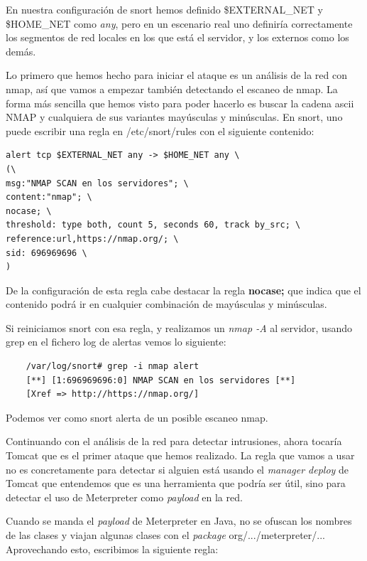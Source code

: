 \documentclass[a4paper,12pt]{scrartcl}
\begin{document}
En nuestra configuración de snort hemos definido \$EXTERNAL\_NET y \$HOME\_NET como \textit{any}, pero en un escenario real uno definiría correctamente los segmentos de red locales en los que está el servidor, y los externos como los demás.

Lo primero que hemos hecho para iniciar el ataque es un análisis de la red con nmap, así que vamos a empezar también detectando el escaneo de nmap. La forma más sencilla que hemos visto para poder hacerlo es buscar la cadena ascii NMAP y cualquiera de sus variantes mayúsculas y minúsculas. En snort, uno puede escribir una regla en /etc/snort/rules con el siguiente contenido:

\begin{verbatim}
alert tcp $EXTERNAL_NET any -> $HOME_NET any \
(\
msg:"NMAP SCAN en los servidores"; \
content:"nmap"; \
nocase; \
threshold: type both, count 5, seconds 60, track by_src; \
reference:url,https://nmap.org/; \
sid: 696969696 \
) 
\end{verbatim}

De la configuración de esta regla cabe destacar la regla \textbf{nocase;} que indica que el contenido podrá ir en cualquier combinación de mayúsculas y minúsculas.

\vspace{10pt}

Si reiniciamos snort con esa regla, y realizamos un \textit{nmap -A} al servidor, usando grep en el fichero log de alertas vemos lo siguiente:

\begin{verbatim}
	/var/log/snort# grep -i nmap alert
	[**] [1:696969696:0] NMAP SCAN en los servidores [**]
	[Xref => http://https://nmap.org/]
\end{verbatim}

\noindent Podemos ver como snort alerta de un posible escaneo nmap.

\vspace{10pt}

Continuando con el análisis de la red para detectar intrusiones, ahora tocaría Tomcat que es el primer ataque que hemos realizado. La regla que vamos a usar no es concretamente para detectar si alguien está usando el \textit{manager deploy} de Tomcat que entendemos que es una herramienta que podría ser útil, sino para detectar el uso de Meterpreter como \textit{payload} en la red.

Cuando se manda el \textit{payload} de Meterpreter en Java, no se ofuscan los nombres de las clases y viajan algunas clases con el \textit{package} org/.../meterpreter/... Aprovechando esto, escribimos la siguiente regla:
\end{document}
